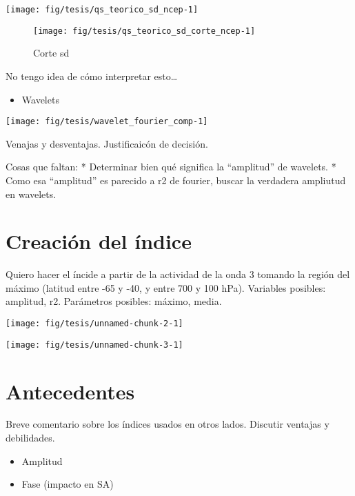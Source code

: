 \documentclass[es-AR,]{tufte-book}
\providecommand{\tightlist}{%
  \setlength{\itemsep}{0pt}\setlength{\parskip}{0pt}}
\begin{document}
\begin{center}\texttt{[image: fig/tesis/qs\_teorico\_sd\_ncep-1]} \end{center}

\begin{figure}

{\centering \texttt{[image: fig/tesis/qs\_teorico\_sd\_corte\_ncep-1]} 

}

\caption[Corte sd]{Corte sd}\label{fig:qs_teorico_sd_corte_ncep}
\end{figure}

No tengo idea de cómo interpretar esto\ldots{}

\begin{itemize}
\tightlist
\item
  Wavelets
\end{itemize}

\texttt{[image: fig/tesis/wavelet\_fourier\_comp-1]}

Venajas y desventajas. Justificaicón de decisión.

Cosas que faltan: * Determinar bien qué significa la ``amplitud'' de
wavelets. * Como esa ``amplitud'' es parecido a r2 de fourier, buscar la
verdadera ampliutud en wavelets.

\section{Creación del índice}\label{creacion-del-indice}

Quiero hacer el íncide a partir de la actividad de la onda 3 tomando la
región del máximo (latitud entre -65 y -40, y entre 700 y 100 hPa).
Variables posibles: amplitud, r2. Parámetros posibles: máximo, media.

\texttt{[image: fig/tesis/unnamed-chunk-2-1]}

\texttt{[image: fig/tesis/unnamed-chunk-3-1]}

\section{Antecedentes}\label{antecedentes}

Breve comentario sobre los índices usados en otros lados. Discutir
ventajas y debilidades.

\begin{itemize}
\tightlist
\item
  Amplitud
\item
  Fase (impacto en SA)
\end{itemize}
\end{document}
